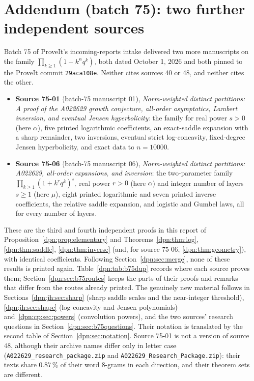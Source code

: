 \documentclass[11pt]{article}
\numberwithin{equation}{section}
\theoremstyle{definition}\newtheorem{definition}[theorem]{Definition}
\theoremstyle{remark}\newtheorem{remark}[theorem]{Remark}
\newcommand{\file}[1]{\nolinkurl{#1}}
\begin{document}
\section{Addendum (batch 75): two further independent sources}\label{dpn:sec:b75}
Batch 75 of ProveIt's incoming-reports intake delivered two more manuscripts
on the family $\prod_{k\ge1}(1+k^\alpha q^k)$, both dated October 1, 2026 and
both pinned to the ProveIt commit \texttt{29aca108e}.  Neither cites sources 40
or 48, and neither cites the other.
\begin{itemize}
\item \textbf{Source 75-01} (batch-75 manuscript 01), \emph{Norm-weighted
  distinct partitions: A proof of the A022629 growth conjecture, all-order
  asymptotics, Lambert inversion, and eventual Jensen hyperbolicity}: the
  family for real power $s>0$ (here $\alpha$), five printed logarithmic
  coefficients, an exact-saddle expansion with a sharp remainder, two
  inversions, eventual strict log-concavity, fixed-degree Jensen
  hyperbolicity, and exact data to $n=10000$.
\item \textbf{Source 75-06} (batch-75 manuscript 06), \emph{Norm-weighted
  distinct partitions: A022629, all-order expansions, and inversion}: the
  two-parameter family $\prod_{k\ge1}(1+k^rq^k)^s$, real power $r>0$ (here
  $\alpha$) and integer number of layers $s\ge1$ (here $\mu$), eight printed
  logarithmic and seven printed inverse coefficients, the relative saddle
  expansion, and logistic and Gumbel laws, all for every number of layers.
\end{itemize}
These are the third and fourth independent proofs in this report of
Proposition~\ref{dpn:prop:elementary} and
Theorems~\ref{dpn:thm:log}, \ref{dpn:thm:saddle}, \ref{dpn:thm:inverse}
(and, for source 75-06, \ref{dpn:thm:geometry}), with identical coefficients.
Following Section~\ref{dpn:sec:merge}, none of these results is printed
again.  Table~\ref{dpn:tab:b75dup} records where each source proves them;
Section~\ref{dpn:sec:b75routes} keeps the parts of their proofs and remarks
that differ from the routes already printed.  The genuinely new material
follows in Sections~\ref{dpn:jh:sec:sharp} (sharp saddle scales and the
near-integer threshold), \ref{dpn:jh:sec:shape} (log-concavity and Jensen
polynomials) and~\ref{dpn:cp:sec:powers} (convolution powers), and the two
sources' research questions in Section~\ref{dpn:sec:b75questions}.  Their
notation is translated by the second table of Section~\ref{dpn:sec:notation}.
Source 75-01 is not a version of source 48, although their archive names
differ only in letter case (\file{A022629_research_package.zip} and
\file{A022629_Research_Package.zip}): their texts share 0.87\,\% of their
word 8-grams in each direction, and their theorem sets are different.
\end{document}
